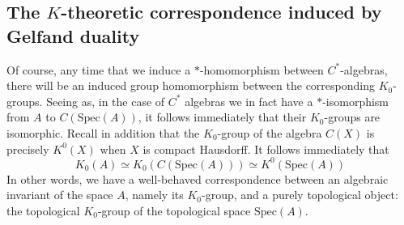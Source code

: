 \documentclass[aps,pra,showpacs,notitlepage,onecolumn,superscriptaddress,nofootinbib]{revtex4-1}
\theoremstyle{definition}
\begin{document}
\subsection{The $K$-theoretic correspondence induced by Gelfand duality}

\noindent Of course, any time that we induce a $*$-homomorphism between $C^{*}$-algebras, there will be an induced group homomorphism between the corresponding
$K_0$-groups. Seeing as, in the case of $C^{*}$ algebras we in fact have a $*$-isomorphism from $A$ to $C(\text{Spec}(A))$, it follows immediately that their $K_0$-groups
are isomorphic. Recall in addition that the $K_0$-group of the algebra $C(X)$ is precisely $K^{0}(X)$ when $X$ is compact Hausdorff. It follows immediately that
\begin{equation}
  K_0(A) \simeq K_0(C(\text{Spec}(A))) \simeq K^0(\text{Spec}(A))
\end{equation}
In other words, we have a well-behaved correspondence between an algebraic invariant of the space $A$, namely its $K_0$-group, and
a purely topological object: the topological $K_0$-group of the topological space $\text{Spec}(A)$.
\end{document}
